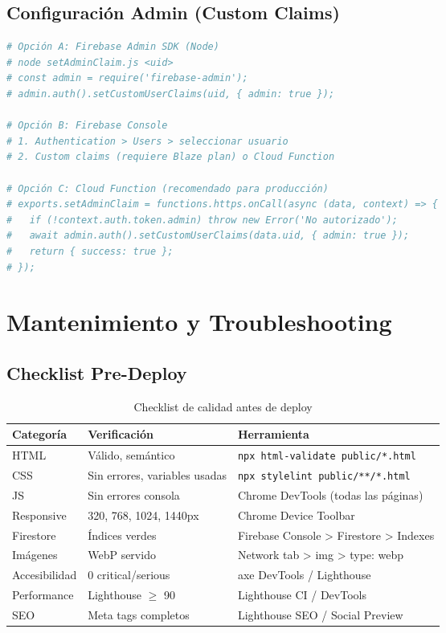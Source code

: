 \documentclass[12pt,a4paper,spanish]{report}
\begin{document}
\section{Configuración Admin (Custom Claims)}
\begin{lstlisting}[language=bash, caption={Asignar claim admin via Firebase CLI}]
# Opción A: Firebase Admin SDK (Node)
# node setAdminClaim.js <uid>
# const admin = require('firebase-admin');
# admin.auth().setCustomUserClaims(uid, { admin: true });

# Opción B: Firebase Console
# 1. Authentication > Users > seleccionar usuario
# 2. Custom claims (requiere Blaze plan) o Cloud Function

# Opción C: Cloud Function (recomendado para producción)
# exports.setAdminClaim = functions.https.onCall(async (data, context) => {
#   if (!context.auth.token.admin) throw new Error('No autorizado');
#   await admin.auth().setCustomUserClaims(data.uid, { admin: true });
#   return { success: true };
# });
\end{lstlisting}

\chapter{Mantenimiento y Troubleshooting}
\label{ch:mantenimiento}

\section{Checklist Pre-Deploy}
\begin{table}[H]
    \centering
    \caption{Checklist de calidad antes de deploy}
    \label{tab:checklist}
    \begin{tabular}{lll}
        \toprule
        \textbf{Categoría} & \textbf{Verificación} & \textbf{Herramienta} \\
        \midrule
        HTML & Válido, semántico & \texttt{npx html-validate public/*.html} \\
        CSS & Sin errores, variables usadas & \texttt{npx stylelint public/**/*.html} \\
        JS & Sin errores consola & Chrome DevTools (todas las páginas) \\
        Responsive & 320, 768, 1024, 1440px & Chrome Device Toolbar \\
        Firestore & Índices verdes & Firebase Console > Firestore > Indexes \\
        Imágenes & WebP servido & Network tab > img > type: webp \\
        Accesibilidad & 0 critical/serious & axe DevTools / Lighthouse \\
        Performance & Lighthouse $\geq$ 90 & Lighthouse CI / DevTools \\
        SEO & Meta tags completos & Lighthouse SEO / Social Preview \\
        \bottomrule
    \end{tabular}
\end{table}
\end{document}
